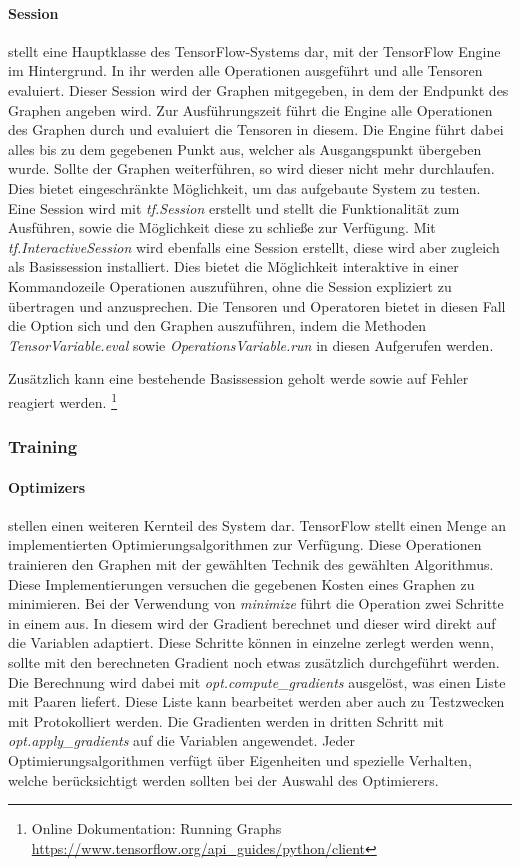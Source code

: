 \paragraph{Session} stellt eine Hauptklasse des TensorFlow-Systems dar, mit der TensorFlow Engine im Hintergrund.
In ihr werden alle Operationen ausgeführt und alle Tensoren evaluiert. 
Dieser Session wird der Graphen mitgegeben, in dem der Endpunkt des Graphen angeben wird. 
Zur Ausführungszeit führt die Engine alle Operationen des Graphen durch und evaluiert die Tensoren in diesem. 
Die Engine führt dabei alles bis zu dem gegebenen Punkt aus, welcher als Ausgangspunkt übergeben wurde. 
Sollte der Graphen weiterführen, so wird dieser nicht mehr durchlaufen. 
Dies bietet eingeschränkte Möglichkeit, um das aufgebaute System zu testen. 
Eine Session wird mit \textit{tf.Session} erstellt und stellt die Funktionalität zum Ausführen, sowie die Möglichkeit diese zu schließe zur Verfügung. 
Mit \textit{tf.InteractiveSession} wird ebenfalls eine Session erstellt, diese wird aber zugleich als Basissession installiert. 
Dies bietet die Möglichkeit interaktive in einer Kommandozeile Operationen auszuführen, ohne die Session expliziert zu übertragen und anzusprechen. 
Die Tensoren und Operatoren bietet in diesen Fall die Option sich und den Graphen auszuführen, indem die Methoden \textit{TensorVariable.eval} sowie \textit{OperationsVariable.run} in diesen Aufgerufen werden. 

\noindent
Zusätzlich kann eine bestehende Basissession geholt werde sowie auf Fehler reagiert werden. 
\footnote{Online Dokumentation: Running Graphs \url{https://www.tensorflow.org/api_guides/python/client}}

\subsubsection{Training}

\paragraph{Optimizers} stellen einen weiteren Kernteil des System dar. 
TensorFlow stellt einen Menge an implementierten Optimierungsalgorithmen zur Verfügung. 
Diese Operationen trainieren den Graphen mit der gewählten Technik des gewählten Algorithmus. 
Diese Implementierungen versuchen die gegebenen Kosten eines Graphen zu minimieren. 
Bei der Verwendung von \textit{minimize} führt die Operation zwei Schritte in einem aus. 
In diesem wird der Gradient berechnet und dieser wird direkt auf die Variablen adaptiert. 
Diese Schritte können in einzelne zerlegt werden wenn, sollte mit den berechneten Gradient noch etwas zusätzlich durchgeführt werden. 
Die Berechnung wird dabei mit \textit{opt.compute\_gradients} ausgelöst, was einen Liste mit Paaren liefert. 
Diese Liste kann bearbeitet werden aber auch zu Testzwecken mit Protokolliert werden. 
Die Gradienten werden in dritten Schritt mit \textit{opt.apply\_gradients} auf die Variablen angewendet. 
Jeder Optimierungsalgorithmen verfügt über Eigenheiten und spezielle Verhalten, welche berücksichtigt werden sollten bei der Auswahl des Optimierers.

